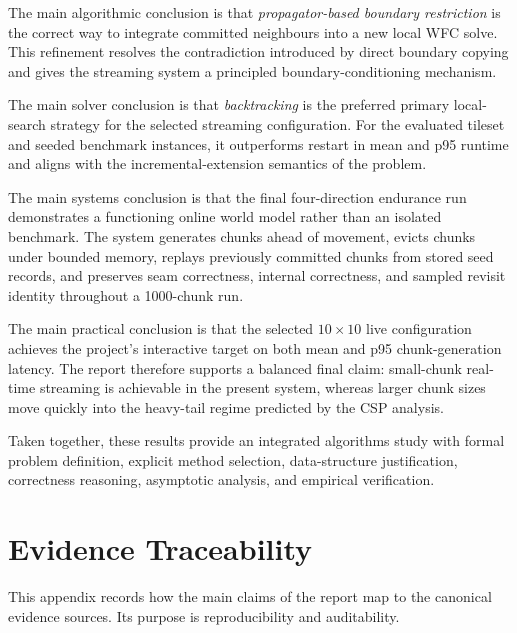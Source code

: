 \documentclass[12pt,a4paper]{report}
\begin{document}
The main algorithmic conclusion is that \emph{propagator-based boundary restriction} is the correct way to integrate committed neighbours into a new local WFC solve. This refinement resolves the contradiction introduced by direct boundary copying and gives the streaming system a principled boundary-conditioning mechanism.

The main solver conclusion is that \emph{backtracking} is the preferred primary local-search strategy for the selected streaming configuration. For the evaluated tileset and seeded benchmark instances, it outperforms restart in mean and p95 runtime and aligns with the incremental-extension semantics of the problem.

The main systems conclusion is that the final four-direction endurance run demonstrates a functioning online world model rather than an isolated benchmark. The system generates chunks ahead of movement, evicts chunks under bounded memory, replays previously committed chunks from stored seed records, and preserves seam correctness, internal correctness, and sampled revisit identity throughout a 1000-chunk run.

The main practical conclusion is that the selected $10 \times 10$ live configuration achieves the project's interactive target on both mean and p95 chunk-generation latency. The report therefore supports a balanced final claim: small-chunk real-time streaming is achievable in the present system, whereas larger chunk sizes move quickly into the heavy-tail regime predicted by the CSP analysis.

Taken together, these results provide an integrated algorithms study with formal problem definition, explicit method selection, data-structure justification, correctness reasoning, asymptotic analysis, and empirical verification.




\appendix
\chapter{Evidence Traceability}
This appendix records how the main claims of the report map to the canonical evidence sources. Its purpose is reproducibility and auditability.
\end{document}
